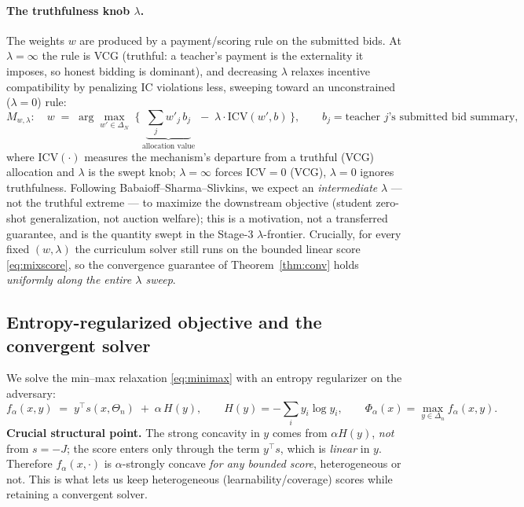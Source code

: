 \documentclass[11pt]{article}
\newcommand{\simplex}{\Delta}
\newcommand{\levelset}{\Theta}     %
\newcommand{\param}{x}             %
\newcommand{\dist}{y}              %
\newcommand{\score}{s}             %
\newcommand{\entropy}{H}
\begin{document}
\paragraph{The truthfulness knob $\lambda$.}
The weights $w$ are produced by a payment/scoring rule on the submitted bids. At $\lambda=\infty$ the rule is VCG (truthful: a teacher's payment is the externality it imposes, so honest bidding is dominant), and decreasing $\lambda$ relaxes incentive compatibility by penalizing IC violations less, sweeping toward an unconstrained ($\lambda=0$) rule:
\begin{equation}
  M_{w,\lambda}:\quad
  w \;=\; \arg\max_{w'\in\simplex_N}\;\Big\{\,\underbrace{\textstyle\sum_j w'_j\,b_j}_{\text{allocation value}}\;-\;\lambda\cdot \mathrm{ICV}(w',b)\,\Big\},
  \qquad b_j=\text{teacher $j$'s submitted bid summary},
  \label{eq:lambda-knob}
\end{equation}
where $\mathrm{ICV}(\cdot)$ measures the mechanism's departure from a truthful (VCG) allocation and $\lambda$ is the swept knob; $\lambda=\infty$ forces $\mathrm{ICV}=0$ (VCG), $\lambda=0$ ignores truthfulness. Following Babaioff--Sharma--Slivkins, we expect an \emph{intermediate} $\lambda$ --- not the truthful extreme --- to maximize the downstream objective (student zero-shot generalization, not auction welfare); this is a motivation, not a transferred guarantee, and is the quantity swept in the Stage-3 $\lambda$-frontier. Crucially, for every fixed $(w,\lambda)$ the curriculum solver still runs on the bounded linear score \eqref{eq:mixscore}, so the convergence guarantee of Theorem~\ref{thm:conv} holds \emph{uniformly along the entire $\lambda$ sweep}.

\subsection{Entropy-regularized objective and the convergent solver}
We solve the min--max relaxation \eqref{eq:minimax} with an entropy regularizer on the adversary:
\begin{equation}
  f_\alpha(\param,\dist) \;=\; \dist^{\top}\score(\param,\levelset_n)\;+\;\alpha\,\entropy(\dist),
  \qquad
  \entropy(\dist)=-\sum_i \dist_i\log \dist_i,
  \qquad
  \Phi_\alpha(\param)=\max_{\dist\in\simplex_n} f_\alpha(\param,\dist).
  \label{eq:reg-obj}
\end{equation}
\textbf{Crucial structural point.} The strong concavity in $\dist$ comes from $\alpha\entropy(\dist)$, \emph{not} from $\score=-J$; the score enters only through the term $\dist^{\top}\score$, which is \emph{linear} in $\dist$. Therefore $f_\alpha(\param,\cdot)$ is $\alpha$-strongly concave \emph{for any bounded score}, heterogeneous or not. This is what lets us keep heterogeneous (learnability/coverage) scores while retaining a convergent solver.
\end{document}
